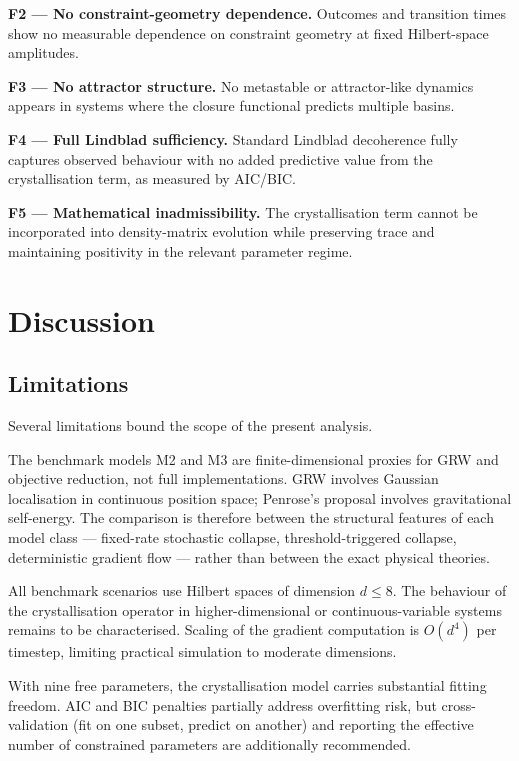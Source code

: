 \documentclass[12pt]{article}
\begin{document}
\textbf{F2 --- No constraint-geometry dependence.} Outcomes and transition times show no measurable dependence on constraint geometry at fixed Hilbert-space amplitudes.

\textbf{F3 --- No attractor structure.} No metastable or attractor-like dynamics appears in systems where the closure functional predicts multiple basins.

\textbf{F4 --- Full Lindblad sufficiency.} Standard Lindblad decoherence fully captures observed behaviour with no added predictive value from the crystallisation term, as measured by AIC/BIC.

\textbf{F5 --- Mathematical inadmissibility.} The crystallisation term cannot be incorporated into density-matrix evolution while preserving trace and maintaining positivity in the relevant parameter regime.

\section{Discussion}
\label{sec:discussion}

\subsection{Limitations}

Several limitations bound the scope of the present analysis.

The benchmark models M2 and M3 are finite-dimensional proxies for GRW and objective reduction, not full implementations. GRW involves Gaussian localisation in continuous position space; Penrose's proposal involves gravitational self-energy. The comparison is therefore between the structural features of each model class --- fixed-rate stochastic collapse, threshold-triggered collapse, deterministic gradient flow --- rather than between the exact physical theories.

All benchmark scenarios use Hilbert spaces of dimension $d \leq 8$. The behaviour of the crystallisation operator in higher-dimensional or continuous-variable systems remains to be characterised. Scaling of the gradient computation is $O(d^4)$ per timestep, limiting practical simulation to moderate dimensions.

With nine free parameters, the crystallisation model carries substantial fitting freedom. AIC and BIC penalties partially address overfitting risk, but cross-validation (fit on one subset, predict on another) and reporting the effective number of constrained parameters are additionally recommended.
\end{document}
